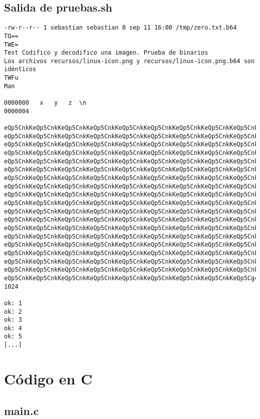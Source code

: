 \documentclass[a4paper,11pt, margin=1in]{article}
\begin{document}
\subsection{Salida de pruebas.sh}
\begin{verbatim}
-rw-r--r-- 1 sebastian sebastian 0 sep 11 16:00 /tmp/zero.txt.b64
TQ==
TWE=
Test Codifico y decodifico una imagen. Prueba de binarios
Los archivos recursos/linux-icon.png y recursos/linux-icon.png.b64 son idénticos
TWFu
Man

0000000   x   y   z  \n
0000004

eQp5CnkKeQp5CnkKeQp5CnkKeQp5CnkKeQp5CnkKeQp5CnkKeQp5CnkKeQp5CnkKeQp5CnkK
eQp5CnkKeQp5CnkKeQp5CnkKeQp5CnkKeQp5CnkKeQp5CnkKeQp5CnkKeQp5CnkKeQp5CnkK
eQp5CnkKeQp5CnkKeQp5CnkKeQp5CnkKeQp5CnkKeQp5CnkKeQp5CnkKeQp5CnkKeQp5CnkK
eQp5CnkKeQp5CnkKeQp5CnkKeQp5CnkKeQp5CnkKeQp5CnkKeQp5CnkKeQp5CnkKeQp5CnkK
eQp5CnkKeQp5CnkKeQp5CnkKeQp5CnkKeQp5CnkKeQp5CnkKeQp5CnkKeQp5CnkKeQp5CnkK
eQp5CnkKeQp5CnkKeQp5CnkKeQp5CnkKeQp5CnkKeQp5CnkKeQp5CnkKeQp5CnkKeQp5CnkK
eQp5CnkKeQp5CnkKeQp5CnkKeQp5CnkKeQp5CnkKeQp5CnkKeQp5CnkKeQp5CnkKeQp5CnkK
eQp5CnkKeQp5CnkKeQp5CnkKeQp5CnkKeQp5CnkKeQp5CnkKeQp5CnkKeQp5CnkKeQp5CnkK
eQp5CnkKeQp5CnkKeQp5CnkKeQp5CnkKeQp5CnkKeQp5CnkKeQp5CnkKeQp5CnkKeQp5CnkK
eQp5CnkKeQp5CnkKeQp5CnkKeQp5CnkKeQp5CnkKeQp5CnkKeQp5CnkKeQp5CnkKeQp5CnkK
eQp5CnkKeQp5CnkKeQp5CnkKeQp5CnkKeQp5CnkKeQp5CnkKeQp5CnkKeQp5CnkKeQp5CnkK
eQp5CnkKeQp5CnkKeQp5CnkKeQp5CnkKeQp5CnkKeQp5CnkKeQp5CnkKeQp5CnkKeQp5CnkK
eQp5CnkKeQp5CnkKeQp5CnkKeQp5CnkKeQp5CnkKeQp5CnkKeQp5CnkKeQp5CnkKeQp5CnkK
eQp5CnkKeQp5CnkKeQp5CnkKeQp5CnkKeQp5CnkKeQp5CnkKeQp5CnkKeQp5CnkKeQp5CnkK
eQp5CnkKeQp5CnkKeQp5CnkKeQp5CnkKeQp5CnkKeQp5CnkKeQp5CnkKeQp5CnkKeQp5CnkK
eQp5CnkKeQp5CnkKeQp5CnkKeQp5CnkKeQp5CnkKeQp5CnkKeQp5CnkKeQp5CnkKeQp5CnkK
eQp5CnkKeQp5CnkKeQp5CnkKeQp5CnkKeQp5CnkKeQp5CnkKeQp5CnkKeQp5CnkKeQp5CnkK
eQp5CnkKeQp5CnkKeQp5CnkKeQp5CnkKeQp5CnkKeQp5CnkKeQp5CnkKeQp5CnkKeQp5CnkK
eQp5CnkKeQp5CnkKeQp5CnkKeQp5CnkKeQp5CnkKeQp5CnkKeQp5CnkKeQp5CnkKeQp5Cg==
1024

ok: 1
ok: 2
ok: 3
ok: 4
ok: 5
[...]
\end{verbatim}

\section{Código en C}
\subsection{main.c}
\end{document}
